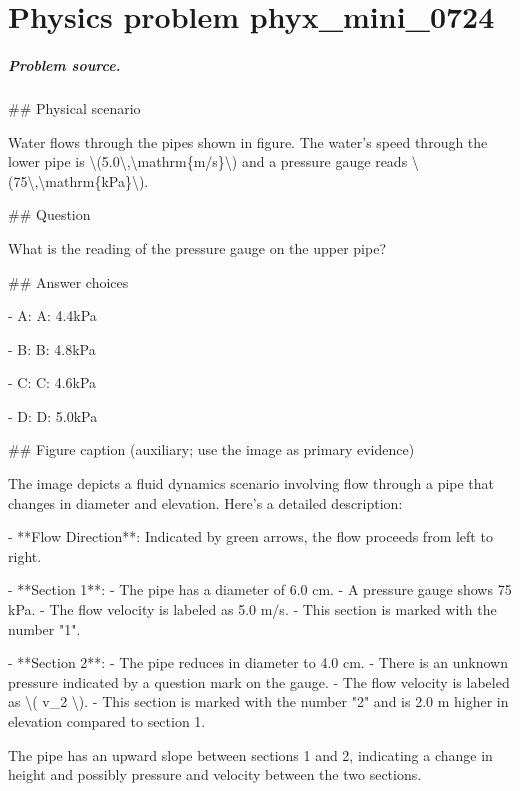 
\chapter{Physics problem phyx\_mini\_0724}
\label{ch:PhyXMiniProblems_problem_phyx_mini_0724}

\paragraph{Problem source.}
\#\# Physical scenario

Water flows through the pipes shown in figure. The water's speed through the lower pipe is \textbackslash{}(5.0\textbackslash{},\textbackslash{}mathrm\{m/s\}\textbackslash{}) and a pressure gauge reads \textbackslash{}(75\textbackslash{},\textbackslash{}mathrm\{kPa\}\textbackslash{}).

\#\# Question

What is the reading of the pressure gauge on the upper pipe?

\#\# Answer choices

- A: A: 4.4kPa

- B: B: 4.8kPa

- C: C: 4.6kPa

- D: D: 5.0kPa

\#\# Figure caption (auxiliary; use the image as primary evidence)

The image depicts a fluid dynamics scenario involving flow through a pipe that changes in diameter and elevation. Here’s a detailed description:

- **Flow Direction**: Indicated by green arrows, the flow proceeds from left to right.

- **Section 1**: 
  - The pipe has a diameter of 6.0 cm.
  - A pressure gauge shows 75 kPa.
  - The flow velocity is labeled as 5.0 m/s.
  - This section is marked with the number "1".

- **Section 2**: 
  - The pipe reduces in diameter to 4.0 cm.
  - There is an unknown pressure indicated by a question mark on the gauge.
  - The flow velocity is labeled as \textbackslash{}( v\_2 \textbackslash{}).
  - This section is marked with the number "2" and is 2.0 m higher in elevation compared to section 1.

The pipe has an upward slope between sections 1 and 2, indicating a change in height and possibly pressure and velocity between the two sections.

